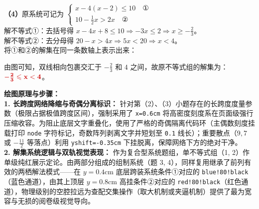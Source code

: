 \vspace{0.4cm}
\textbf{（4）}原系统可记为 $\begin{cases} x-4(x-2) \leqslant 10 \quad \text{①} \\ 10-\frac{1}{2}x > 2x \quad \text{②} \end{cases}$ \\
解不等式①：去括号得 $x-4x+8 \leqslant 10 \Rightarrow -3x \leqslant 2 \Rightarrow x \geqslant -\frac{2}{3}$。\\
解不等式②：去分母得 $20-x > 4x \Rightarrow 5x < 20 \Rightarrow x < 4$。\\
将①和②的解集在同一条数轴上表示出来：
\begin{center}
\end{center}
由图可知，双线相向包裹交汇于 $-\frac{2}{3}$ 和 $4$ 之间，故原不等式组的解集为：$\textcolor{red!80!black}{\mathbf{-\frac{2}{3} \leqslant x < 4}}$。

\vspace{0.4cm}
{\small\color{blue!70!black}
\textbf{绘图原理与步骤：}\\
\textbf{1. 长跨度网络降缩与奇偶分离标识：} 针对第（2）、（3）小题存在的长跨度度量参数（极限占据极值跨度区间），强制采用了 \texttt{x=0.6cm} 将高密度刻度系在页面级强行压缩收容。为阻止底层文字重叠化，使用了严格的奇偶隔离代码环（主偶数刻度挂载打印 \texttt{node} 字符标记，奇数阵列剥离文字并短划至 \texttt{0.1} 线长）；重要散点（$9, 7$ 或 $-\frac{11}{2}$ 等落点）利用 \texttt{yshift=-0.35cm} 下挂脱离，保障网络下方的绝对干净。\\
\textbf{2. 解集系统逻辑与双轨视觉表现：} 作为复合型系统题组，单不等式组（1, 2）作单级纯红展示定论。由两部分组成的组制系统（题 3, 4），同样复用继承了前列有效的两栖解法模式——在 $y=0.4\mathrm{cm}$ 底层跨装系统条件①对应的 \texttt{blue!80!black}（蓝色通道），由其上顶层 $y=0.8\mathrm{cm}$ 高挂条件②对应的 \texttt{red!80!black}（红色通道），物理级别的空腔拉远为查配交集操作（取大机制或夹逼机制）提供了最为宽容与无损的阅卷级视觉导向。
}

